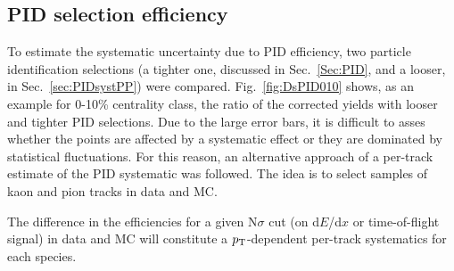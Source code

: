 \subsection{PID selection efficiency}
\label{sec:PIDsystAA}
To estimate the systematic uncertainty due to PID efficiency,
two particle identification selections (a tighter one, discussed in Sec.~\ref{Sec:PID}, and a 
looser, in Sec.~\ref{sec:PIDsystPP}) were compared. Fig.~\ref{fig:DsPID010} 
shows, as an example for 0-10\% centrality class, the ratio of the corrected yields 
with looser and tighter PID selections. Due to the large error bars, it is difficult to asses
whether the points are affected by a systematic effect
or they are dominated by statistical fluctuations.
For this reason, an alternative approach of a per-track estimate of the PID
systematic was followed. The idea is to select samples of kaon and pion tracks in data and
MC. 

The difference in the efficiencies for a given N$\sigma$ cut (on d$E$/d$x$ or 
time-of-flight signal) in data and MC will
constitute a $p_{\rm T}$-dependent per-track systematics for each species.

